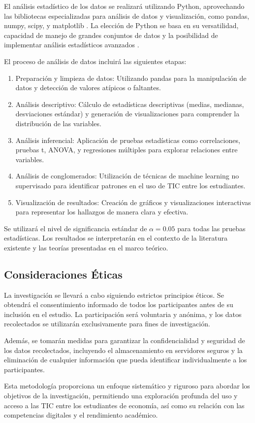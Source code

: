 \documentclass[12pt, a4paper]{article}
\begin{document}
El análisis estadístico de los datos se realizará utilizando Python, aprovechando las bibliotecas especializadas para análisis de datos y visualización, como pandas, numpy, scipy, y matplotlib \parencite{McKinney2017}. La elección de Python se basa en su versatilidad, capacidad de manejo de grandes conjuntos de datos y la posibilidad de implementar análisis estadísticos avanzados \parencite{VanderPlas2016}.

El proceso de análisis de datos incluirá las siguientes etapas:

\begin{enumerate}
    \item Preparación y limpieza de datos: Utilizando pandas para la manipulación de datos y detección de valores atípicos o faltantes.
    \item Análisis descriptivo: Cálculo de estadísticas descriptivas (medias, medianas, desviaciones estándar) y generación de visualizaciones para comprender la distribución de las variables.
    \item Análisis inferencial: Aplicación de pruebas estadísticas como correlaciones, pruebas t, ANOVA, y regresiones múltiples para explorar relaciones entre variables.
    \item Análisis de conglomerados: Utilización de técnicas de machine learning no supervisado para identificar patrones en el uso de TIC entre los estudiantes.
    \item Visualización de resultados: Creación de gráficos y visualizaciones interactivas para representar los hallazgos de manera clara y efectiva.
\end{enumerate}

Se utilizará el nivel de significancia estándar de $\alpha = 0.05$ para todas las pruebas estadísticas. Los resultados se interpretarán en el contexto de la literatura existente y las teorías presentadas en el marco teórico.

\subsection{Consideraciones Éticas}

La investigación se llevará a cabo siguiendo estrictos principios éticos. Se obtendrá el consentimiento informado de todos los participantes antes de su inclusión en el estudio. La participación será voluntaria y anónima, y los datos recolectados se utilizarán exclusivamente para fines de investigación. 

Además, se tomarán medidas para garantizar la confidencialidad y seguridad de los datos recolectados, incluyendo el almacenamiento en servidores seguros y la eliminación de cualquier información que pueda identificar individualmente a los participantes.

Esta metodología proporciona un enfoque sistemático y riguroso para abordar los objetivos de la investigación, permitiendo una exploración profunda del uso y acceso a las TIC entre los estudiantes de economía, así como su relación con las competencias digitales y el rendimiento académico.


\newpage
\printbibliography
\end{document}
